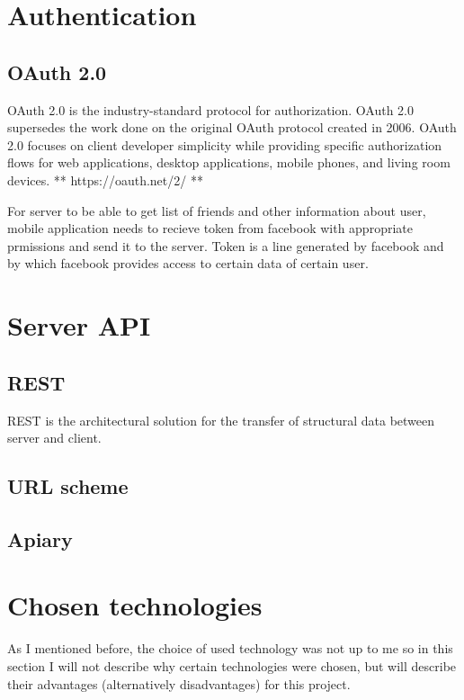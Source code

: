 \section{Authentication}
\subsection{OAuth 2.0}
OAuth 2.0 is the industry-standard protocol for authorization. OAuth 2.0 supersedes the work done on the original OAuth
protocol created in 2006. OAuth 2.0 focuses on client developer simplicity while providing specific authorization flows
for web applications, desktop applications, mobile phones, and living room devices. ** https://oauth.net/2/ **

For server to be able to get list of friends and other information about user, mobile application needs to recieve
token from facebook with appropriate prmissions and send it to the server. Token is a line generated by facebook and
by which facebook provides access to certain data of certain user.

\section{Server API}

\subsection{REST}
\ac{REST} is the architectural solution for the transfer of structural data between server and client.
\subsection{URL scheme}
\subsection{Apiary}


\section{Chosen technologies}
As I mentioned before, the choice of used technology was not up to me so in this section I will not describe why
certain technologies were chosen, but will describe their advantages (alternatively disadvantages) for this project.


